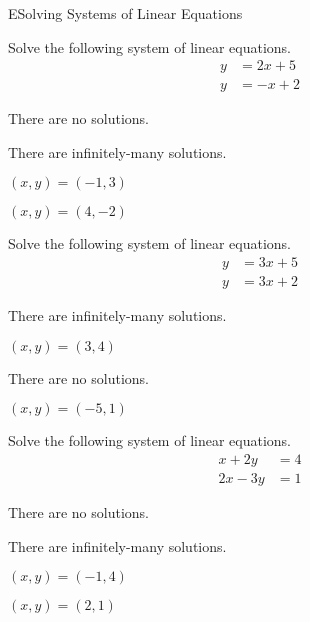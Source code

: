 \documentclass{article}[12pt]
\begin{document}
\begin{module}{E}{Solving Systems of Linear Equations}
\begin{readinessAssuranceTest}
\item Solve the following system of linear equations.
      \begin{align*}
      y   &=   2x+5 \\
      y  &=  -x+2
      \end{align*}

\begin{multicols}{4}
\begin{readinessAssuranceTestChoices}
\item There are no solutions.
\item There are infinitely-many solutions.
\item \((x,y)=(-1,3)\) %
\item \((x,y)=(4,-2)\)
\end{readinessAssuranceTestChoices}
\end{multicols}


\item Solve the following system of linear equations.
      \begin{align*}
      y   &=  3x+5 \\
      y  &=  3x+2
      \end{align*}

\begin{multicols}{4}
\begin{readinessAssuranceTestChoices}
\item There are infinitely-many solutions.
\item
\((x,y)=(3,4)\)
\item There are no solutions. %
\item
\((x,y)=(-5,1)\)
\end{readinessAssuranceTestChoices}
\end{multicols}


\item Solve the following system of linear equations.
      \begin{align*}
      x+2y   &=   4 \\
      2x-3y  &=  1
      \end{align*}

\begin{multicols}{4}
\begin{readinessAssuranceTestChoices}
\item There are no solutions.
\item There are infinitely-many solutions.
\item
\((x,y)=(-1,4)\)
\item
\((x,y)=(2,1)\) %
\end{readinessAssuranceTestChoices}
\end{multicols}



\end{readinessAssuranceTest}
\end{module}
\end{document}
